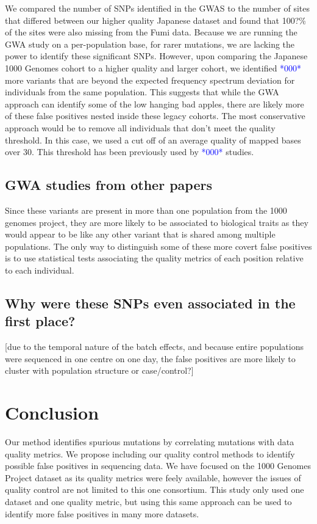\documentclass[]{elife}
\newcommand{\todo}[1]{\textcolor{blue}{*#1*}}
\begin{document}
We compared the number of SNPs identified in the GWAS to the number of sites that differed between our higher quality Japanese dataset and found that 100?\% of the sites were also missing from the Fumi data. 
Because we are running the GWA study on a per-population base, for rarer mutations, we are lacking the power to identify these significant SNPs.  
However, upon comparing the Japanese 1000 Genomes cohort to a higher quality and larger cohort, we identified \todo{000} more variants that are beyond the expected frequency spectrum deviation for individuals from the same population. 
This suggests that while the GWA approach can identify some of the low hanging bad apples, there are likely more of these false positives nested inside these legacy cohorts. 
The most conservative approach would be to remove all individuals that don't meet the quality threshold. 
In this case, we used a cut off of an average quality of mapped bases over 30. This threshold has been previously used by \todo{000} studies.

\subsection{GWA studies from other papers}
Since these variants are present in more than one population from the 1000 genomes project, they are more likely to be associated to biological traits as they would appear to be like any other variant that is shared among multiple populations. 
The only way to distinguish some of these more covert false positives is to use statistical tests associating the quality metrics of each position relative to each individual. 

\subsection{Why were these SNPs even associated in the first place?}
[due to the temporal nature of the batch effects, and because entire populations were sequenced in one centre on one day, the false positives are more likely to cluster with population structure or case/control?]

			\section{Conclusion}
Our method identifies spurious mutations by correlating mutations with data quality metrics. 
We propose including our quality control methods to identify possible false positives in sequencing data. 
We have focused on the 1000 Genomes Project dataset as its quality metrics were feely available, however the issues of quality control are not limited to this one consortium. 
This study only used one dataset and one quality metric, but using this same approach can be used to identify more false positives in many more datasets. 
\end{document}
